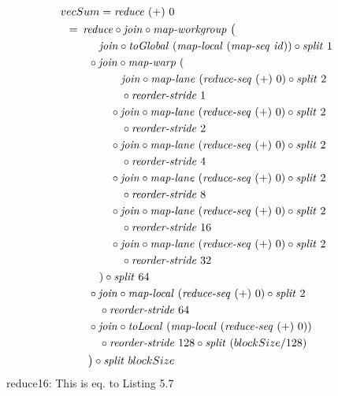 \begin{align}
  &\hspace{-1.5em}vecSum = \reduce\ (+)\ 0\nonumber\\
  &\hspace{-2em}\quad\begin{aligned}
    &=\hspace{.2em}
      \reduce \circ \join \circ \mapWorkgroup\ \big(\\
      &\qquad\ \ \ \join \circ \toGlobal\ (\mapLocal\ (\mapSeq\ \id)) \circ \splitN\ 1\\
      &\qquad \circ \join \circ \mapWarp\ (\\
      &\qquad\qquad\ \ \ \join \circ \mapLane\ (\reduceSeq\ (+)\ 0) \circ \splitN\ 2\\
      &\qquad\qquad\quad \circ \reorderStride\ 1\\
      &\qquad\qquad \circ \join \circ \mapLane\ (\reduceSeq\ (+)\ 0) \circ \splitN\ 2\\
      &\qquad\qquad\quad \circ \reorderStride\ 2\\
      &\qquad\qquad \circ \join \circ \mapLane\ (\reduceSeq\ (+)\ 0) \circ \splitN\ 2\\
      &\qquad\qquad\quad \circ \reorderStride\ 4\\
      &\qquad\qquad \circ \join \circ \mapLane\ (\reduceSeq\ (+)\ 0) \circ \splitN\ 2\\
      &\qquad\qquad\quad \circ \reorderStride\ 8\\
      &\qquad\qquad \circ \join \circ \mapLane\ (\reduceSeq\ (+)\ 0) \circ \splitN\ 2\\
      &\qquad\qquad\quad \circ \reorderStride\ 16\\
      &\qquad\qquad \circ \join \circ \mapLane\ (\reduceSeq\ (+)\ 0) \circ \splitN\ 2\\
      &\qquad\qquad\quad \circ \reorderStride\ 32\\
      &\qquad\quad) \circ \splitN\ 64\\
      &\qquad \circ \join \circ \mapLocal\ (\reduceSeq\ (+)\ 0) \circ \splitN\ 2\\
      &\qquad\quad \circ \reorderStride\ 64\\
      &\qquad \circ \join \circ\toLocal\ (\mapLocal\ (\reduceSeq\ (+)\ 0))\\
      &\qquad\quad \circ \reorderStride\ 128 \circ \splitN\ (blockSize/128)\\
      &\qquad\big) \circ \splitN\ blockSize
  \end{aligned}
\end{align}
reduce16: This is eq. to Listing 5.7

